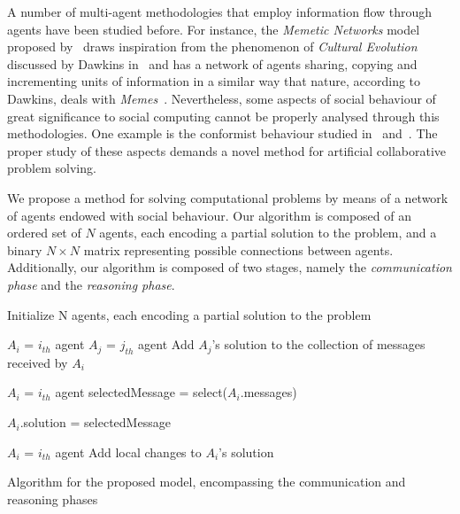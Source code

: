 \documentclass{article}
\begin{document}
A number of multi-agent methodologies that employ information flow through agents have been studied before. For instance, the {\em Memetic Networks} model proposed by~\cite{araujo:memenet} draws inspiration from the phenomenon of {\em Cultural Evolution} discussed by Dawkins in~\cite{dawkins:selfishgene} and has a network of agents sharing, copying and incrementing units of information in a similar way that nature, according to Dawkins, deals with {\em Memes}~\cite{dawkins:selfishgene}. Nevertheless, some aspects of social behaviour of great significance to social computing cannot be properly analysed through this methodologies. One example is the conformist behaviour studied in~\cite{cefferson:conformists} and~\cite{farenzena:collabem}. The proper study of these aspects demands a novel method for artificial collaborative problem solving.

We propose a method for solving computational problems by means of a network of agents endowed with social behaviour. Our algorithm is composed of an ordered set of $N$ agents, each encoding a partial solution to the problem, and a binary $N \times N$ matrix representing possible connections between agents. Additionally, our algorithm is composed of two stages, namely the {\em communication phase} and the {\em reasoning phase}.

\begin{algorithm}
 \SetAlgoLined
 Initialize N agents, each encoding a partial solution to the problem\;
 {
 	{
 		{
 			{
 				$A_{i}$ = $i_{th}$ agent\;
 				$A_{j}$ = $j_{th}$ agent\;
 				Add $A_{j}$'s solution to the collection of messages received by $A_{i}$\; %
 			}
 		}
 	}
 	{
 		\;
 		$A_{i}$ = $i_{th}$ agent\;
 		selectedMessage = select($A_{i}$.messages)\;
 		
 		{
 			$A_{i}$.solution = selectedMessage\;
 		}
 	}
 	{
 		\;
 		$A_{i}$ = $i_{th}$ agent\;
 		Add local changes to $A_{i}$'s solution%
 	}
 }
 \caption{Algorithm for the proposed model, encompassing the communication and reasoning phases}
\end{algorithm}
\end{document}
